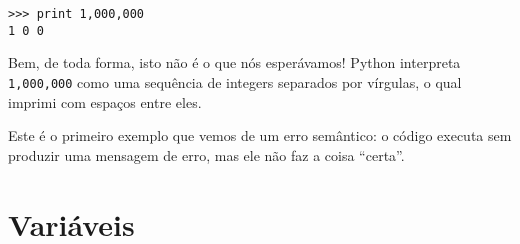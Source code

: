 \beforeverb
\begin{verbatim}
>>> print 1,000,000
1 0 0
\end{verbatim}
\afterverb
%

Bem, de toda forma, isto não é o que nós esperávamos!  Python interpreta {\tt
  1,000,000} como  uma sequência de integers separados por vírgulas, o qual 
imprimi com espaços entre eles.


Este é o primeiro exemplo que vemos de um erro semântico: o código 
executa sem produzir uma mensagem de erro, mas ele não faz a 
coisa ``certa''.

\section{Variáveis}



